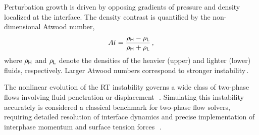 Perturbation growth is driven by opposing gradients of pressure and density localized 
at the interface. The density contrast is quantified by the non-dimensional Atwood number,
\[
At = \frac{\rho_{\mathsf {H}} - \rho_{\mathsf {L}}}{\rho_{\mathsf {H}} + \rho_{\mathsf {L}}}\,,
\]
where \(\rho_{\mathsf {H}}\) and \(\rho_{\mathsf {L}}\) denote the densities of the heavier (upper) and lighter 
(lower) fluids, respectively. Larger Atwood numbers correspond to stronger instability\,.

The nonlinear evolution of the RT instability governs a wide class of two-phase flows 
involving fluid penetration or displacement~\cite{tryggvasonNumericalSimulationsRayleighTaylor1988}\,. 
Simulating this instability accurately is considered a classical benchmark for two-phase 
flow solvers, requiring detailed resolution of interface dynamics and precise implementation 
of interphase momentum and surface tension forces~\cite{gouldingSimplifiedConservativeDiscretization2024}\,.

